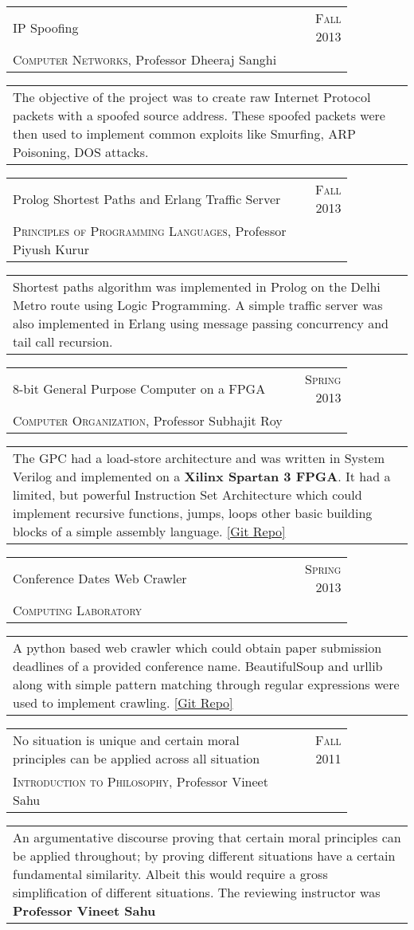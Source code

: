 \documentclass[a4paper,10pt]{article} %
\newcommand{\project}[4]{
    \begin{tabular}{p{0.85\linewidth}r}
        \textcolor{NavyBlue}{#2} & \multicolumn{1}{m{3cm}}{\raggedleft \textsc{#1}}\\
        #3
    \end{tabular}
    \begin{tabular}{p{\linewidth}}
        \footnotesize{#4}
    \end{tabular}
    \vspace{-0.1cm}
}
\begin{document}
\project {Fall 2013}
         {IP Spoofing}
         {\textsc{Computer Networks}, Professor Dheeraj Sanghi}
         {The objective of the project was to create raw Internet Protocol packets with a spoofed source
          address. These spoofed packets were then used to implement common exploits like Smurfing,
          ARP Poisoning, DOS attacks.}

\project {Fall 2013}
         {Prolog Shortest Paths and Erlang Traffic Server}
         {\textsc{Principles of Programming Languages}, Professor Piyush Kurur}
         {Shortest paths algorithm was implemented in Prolog on the Delhi Metro route
          using Logic Programming. A simple traffic server was also implemented in Erlang
          using message passing concurrency and tail call recursion.}

\project {Spring 2013}
         {8-bit General Purpose Computer on a FPGA}
         {\textsc{Computer Organization}, Professor Subhajit Roy}
         {The GPC had a load-store architecture and was written in System Verilog and
          implemented on a \textbf{Xilinx Spartan 3 FPGA}. It had a limited, but powerful
          Instruction Set Architecture which could implement recursive functions, jumps,
          loops  other basic building blocks of a simple assembly language.
          \href{https://github.com/srijanshetty/220_y11} {[Git Repo]}}

\project {Spring 2013}
         {Conference Dates Web Crawler}
         {\textsc{Computing Laboratory}}
         {A python based web crawler which could obtain paper submission
          deadlines of a provided conference name.  BeautifulSoup and urllib along
          with simple pattern matching through regular expressions were used to implement crawling.
          \href{https://github.com/srijanshetty/crawler} {[Git Repo]}}

\project {Fall 2011}
         {No situation is unique and certain moral principles can be applied across all situation}
         {\textsc{Introduction to Philosophy}, Professor Vineet Sahu}
         {An argumentative discourse proving that certain moral principles
          can be applied throughout; by proving different situations have a certain
          fundamental similarity.  Albeit this would require a gross simplification of
          different situations.  The reviewing instructor was \textbf{Professor Vineet Sahu}}

\end{document}
